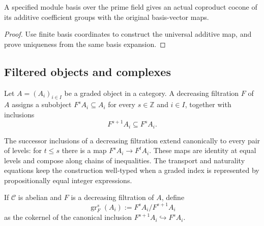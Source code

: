 \begin{proposition}
  \label{prop:basis-additive-coproduct}
  \leanok
  A specified module basis over the prime field gives an actual coproduct cocone of its additive coefficient groups with the original basis-vector maps.
\end{proposition}
\begin{proof}
  Use finite basis coordinates to construct the universal additive map, and prove uniqueness from the same basis expansion.
  \leanok
\end{proof}

\subsection{Filtered objects and complexes}

\begin{definition}
  \leanok
  \label{def:core-filtration}
  Let $A=(A_i)_{i\in I}$ be a graded object in a category.  A decreasing
  filtration $F$ of $A$ assigns a subobject $F^sA_i\subseteq A_i$ for every
  $s\in\mathbb Z$ and $i\in I$, together with inclusions
  \[
    F^{s+1}A_i\subseteq F^sA_i.
  \]
\end{definition}

\begin{definition}
  \leanok
  \label{def:core-filtration-inclusions}
  The successor inclusions of a decreasing filtration extend canonically to
  every pair of levels: for $t\le s$ there is a map
  $F^sA_i\to F^tA_i$.  These maps are identity at equal levels and compose
  along chains of inequalities.  The transport and naturality equations keep
  the construction well-typed when a graded index is represented by
  propositionally equal integer expressions.
\end{definition}

\begin{definition}
  \leanok
  \label{def:core-associated-graded}
  If $\mathcal C$ is abelian and $F$ is a decreasing filtration of $A$, define
  \[
    \operatorname{gr}^s_F(A_i) := F^sA_i/F^{s+1}A_i
  \]
  as the cokernel of the canonical inclusion
  $F^{s+1}A_i\hookrightarrow F^sA_i$.
\end{definition}

